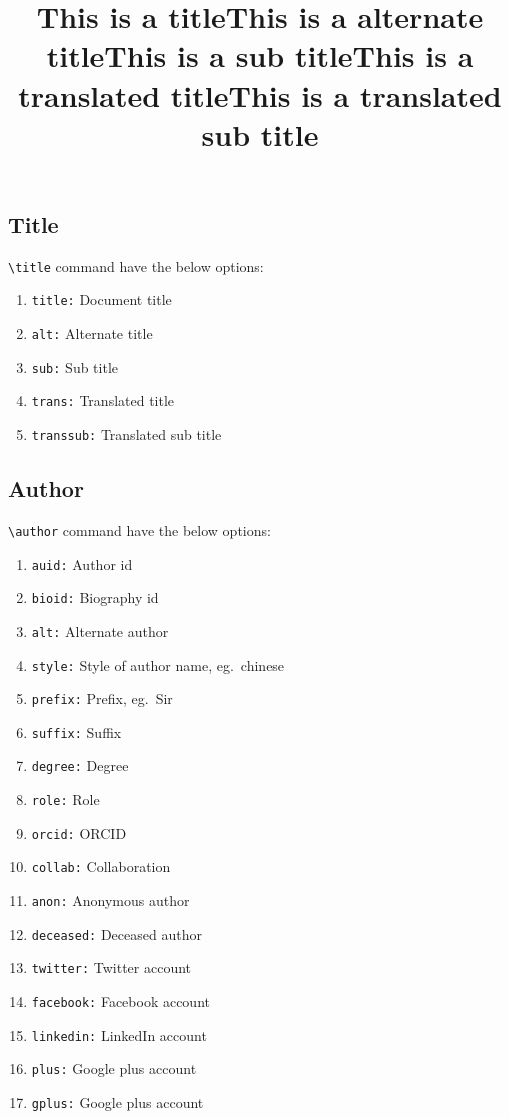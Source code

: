 \documentclass[a4paper,12pt]{article}
\begin{document}
\subsection{Title}

\verb+\title+ command have the below options:
\begin{enumerate}
\item \verb+title:+ Document title
\item \verb+alt:+ Alternate title
\item \verb+sub:+ Sub title
\item \verb+trans:+ Translated title
\item \verb+transsub:+ Translated sub title
\end{enumerate}

\begin{vquote}
 \title[mode=title]{This is a title}
 \title[mode=alt]{This is a alternate title}
 \title[mode=sub]{This is a sub title}
 \title[mode=trans]{This is a translated title}
 \title[mode=transsub]{This is a translated sub title}
\end{vquote}


\subsection{Author}
\verb+\author+ command have the below options: 

\begin{enumerate}
\item \verb+auid:+ Author id
\item \verb+bioid:+ Biography id
\item \verb+alt:+ Alternate author
\item \verb+style:+ Style of author name, eg.\ chinese
\item \verb+prefix:+ Prefix, eg.\ Sir
\item \verb+suffix:+ Suffix
\item \verb+degree:+ Degree
\item \verb+role:+ Role
\item \verb+orcid:+ ORCID
\item \verb+collab:+ Collaboration
\item \verb+anon:+ Anonymous author
\item \verb+deceased:+ Deceased author
\item \verb+twitter:+ Twitter account
\item \verb+facebook:+ Facebook account
\item \verb+linkedin:+ LinkedIn account
\item \verb+plus:+ Google plus account
\item \verb+gplus:+ Google plus account
\end{enumerate}
\end{document}
